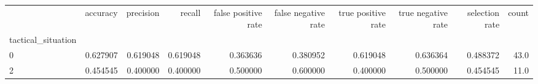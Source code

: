 \begin{tabular}{lrrrrrrrrr}
\toprule
{} &  accuracy &  precision &    recall &  false positive rate &  false negative rate &  true positive rate &  true negative rate &  selection rate &  count \\
tactical\_situation &           &            &           &                      &                      &                     &                     &                 &        \\
\midrule
0                  &  0.627907 &   0.619048 &  0.619048 &             0.363636 &             0.380952 &            0.619048 &            0.636364 &        0.488372 &   43.0 \\
2                  &  0.454545 &   0.400000 &  0.400000 &             0.500000 &             0.600000 &            0.400000 &            0.500000 &        0.454545 &   11.0 \\
\bottomrule
\end{tabular}
